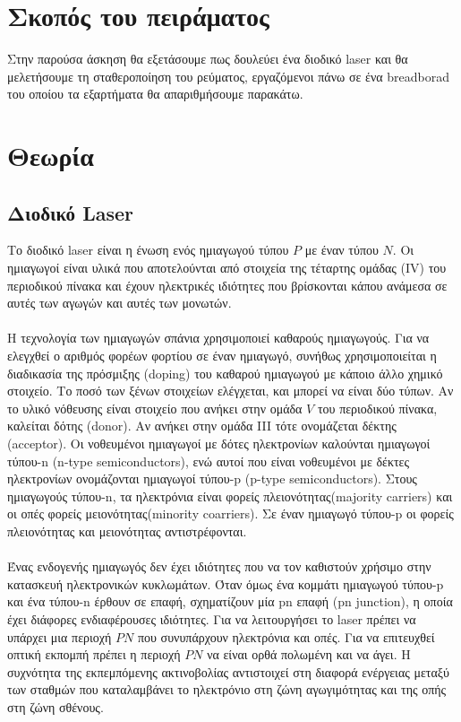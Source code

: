 \documentclass[a4paper,12pt,titlepage]{article}
\begin{document}
\section{Σκοπός του πειράματος}

Στην παρούσα άσκηση θα εξετάσουμε πως δουλεύει ένα διοδικό laser και θα μελετήσουμε τη σταθεροποίηση του ρεύματος, εργαζόμενοι πάνω σε ένα breadborad του οποίου τα εξαρτήματα θα απαριθμήσουμε παρακάτω.

\section{Θεωρία}

\subsection{Διοδικό Laser}
Το διοδικό laser είναι η ένωση ενός ημιαγωγού τύπου $P$ με έναν τύπου $N$. Οι ημιαγωγοί είναι υλικά που αποτελούνται από στοιχεία της τέταρτης ομάδας (IV) του περιοδικού πίνακα και έχουν ηλεκτρικές ιδιότητες που βρίσκονται κάπου ανάμεσα σε αυτές των αγωγών και αυτές των μονωτών. \\\\
H τεχνολογία των ημιαγωγών σπάνια χρησιμοποιεί καθαρούς ημιαγωγούς. Για να ελεγχθεί ο αριθμός φορέων φορτίου σε έναν ημιαγωγό, συνήθως χρησιμοποιείται η διαδικασία της πρόσμιξης (doping) του καθαρού ημιαγωγού με κάποιο άλλο χημικό στοιχείο. Το ποσό των ξένων στοιχείων ελέγχεται, και μπορεί να είναι δύο τύπων. Αν το υλικό νόθευσης είναι στοιχείο που ανήκει στην ομάδα $V$ του περιοδικού πίνακα, καλείται δότης (donor). Αν ανήκει στην ομάδα III τότε ονομάζεται δέκτης (acceptor). Οι νοθευμένοι ημιαγωγοί με δότες ηλεκτρονίων καλούνται ημιαγωγοί τύπου-n (n-type semiconductors), ενώ αυτοί που είναι νοθευμένοι με δέκτες ηλεκτρονίων ονομάζονται ημιαγωγοί τύπου-p (p-type semiconductors). Στους ημιαγωγούς τύπου-n, τα ηλεκτρόνια είναι φορείς πλειονότητας(majority carriers) και οι οπές φορείς μειονότητας(minority coarriers). Σε έναν ημιαγωγό τύπου-p οι φορείς πλειονότητας και μειονότητας αντιστρέφονται.\\\\
Ένας ενδογενής ημιαγωγός δεν έχει ιδιότητες που να τον καθιστούν χρήσιμο στην κατασκευή ηλεκτρονικών κυκλωμάτων. Όταν όμως ένα κομμάτι ημιαγωγού τύπου-p και ένα τύπου-n έρθουν σε επαφή, σχηματίζουν μία pn επαφή (pn junction), η οποία έχει διάφορες ενδιαφέρουσες ιδιότητες. Για να λειτουργήσει το laser πρέπει να υπάρχει μια περιοχή $PN$ που συνυπάρχουν ηλεκτρόνια και οπές. Για να επιτευχθεί οπτική εκπομπή πρέπει η περιοχή $PN$ να είναι ορθά πολωμένη και να άγει. Η συχνότητα της εκπεμπόμενης ακτινοβολίας αντιστοιχεί στη διαφορά ενέργειας μεταξύ των σταθμών που καταλαμβάνει το ηλεκτρόνιο στη ζώνη αγωγιμότητας και της οπής στη ζώνη σθένους. \\\\
\end{document}
